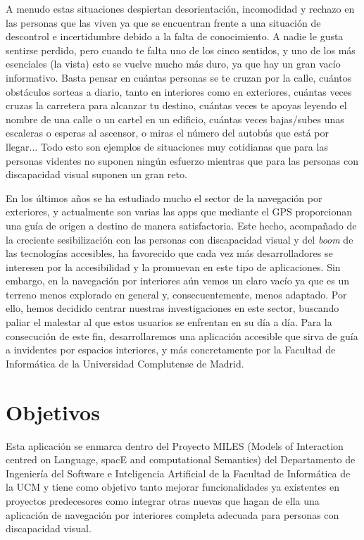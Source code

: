 A menudo estas situaciones despiertan desorientación, incomodidad y rechazo en las personas que las viven ya que se encuentran frente a una situación de descontrol e incertidumbre debido a la falta de conocimiento. A nadie le gusta sentirse perdido, pero cuando te falta uno de los cinco sentidos, y uno de los más esenciales (la vista) esto se vuelve mucho más duro, ya que hay un gran vacío informativo. Basta pensar en cuántas personas se te cruzan por la calle, cuántos obstáculos sorteas a diario, tanto en interiores como en exteriores, cuántas veces cruzas la carretera para alcanzar tu destino, cuántas veces te apoyas leyendo el nombre de una calle o un cartel en un edificio, cuántas veces bajas/subes unas escaleras o esperas al ascensor, o miras el número del autobús que está por llegar... Todo esto son ejemplos de situaciones muy cotidianas que para las personas videntes no suponen ningún esfuerzo mientras que para las personas con discapacidad visual suponen un gran reto. 

En los últimos años se ha estudiado mucho el sector de la navegación por exteriores, y actualmente son varias las apps que mediante el GPS proporcionan una guía de origen a destino de manera satisfactoria. Este hecho, acompañado de la creciente sesibilización con las personas con discapacidad visual y del \textit{boom} de las tecnologías accesibles, ha favorecido que cada vez más desarrolladores se interesen por la accesibilidad y la promuevan en este tipo de aplicaciones. Sin embargo, en la navegación por interiores aún vemos un claro vacío ya que es un terreno menos explorado en general y, consecuentemente, menos adaptado. Por ello, hemos decidido centrar nuestras investigaciones en este sector, buscando paliar el malestar al que estos usuarios se enfrentan en su día a día. Para la consecución de este fin, desarrollaremos una aplicación accesible que sirva de guía a invidentes por espacios interiores, y más concretamente por la Facultad de Informática de la Universidad Complutense de Madrid.


\section{Objetivos}

Esta aplicación se enmarca dentro del Proyecto MILES (Models of Interaction centred on Language, spacE and computational Semantics) del Departamento de
Ingeniería del Software e Inteligencia Artificial de la Facultad de Informática de la UCM y tiene
como objetivo tanto mejorar funcionalidades ya existentes en proyectos predecesores como integrar otras nuevas que hagan de ella una aplicación de navegación por interiores completa adecuada para personas con discapacidad visual.

